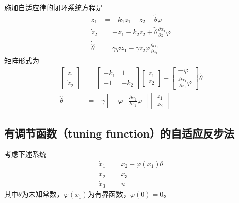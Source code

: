 \begin{note}
    施加自适应律的闭环系统方程是
\begin{align*}
  \dot{z}_1 & = - k_1 z_1 + z_2 - \tilde{\theta} \varphi\\
  \dot{z}_2 & = - z_1 - k_2 z_2 + \tilde{\theta} \frac{\partial
  \alpha_1}{\partial z_1} \varphi\\
  \dot{\hat{\theta}} & = \gamma \varphi z_1 - \gamma z_2 \varphi
  \frac{\partial \alpha_1}{\partial z_1}
\end{align*}
矩阵形式为
\begin{align*}
  \left[\begin{array}{c}
    \dot{z}_1\\
    \dot{z}_2
  \end{array}\right] & = \left[\begin{array}{cc}
    - k_1 & 1\\
    - 1 & - k_2
  \end{array}\right] \left[\begin{array}{c}
    z_1\\
    z_2
  \end{array}\right] + \left[\begin{array}{c}
    - \varphi\\
    \frac{\partial \alpha_1}{\partial z_1} \varphi
  \end{array}\right] \tilde{\theta}\\
  \dot{\hat{\theta}} & = - \gamma \left[\begin{array}{cc}
    - \varphi & \frac{\partial \alpha_1}{\partial z_1} \varphi
  \end{array}\right] \left[\begin{array}{c}
    z_1\\
    z_2
  \end{array}\right]
\end{align*}
\end{note}
\subsection{有调节函数（tuning function）的自适应反步法}
考虑下述系统
\begin{equation}
    \begin{aligned}
        \dot{x}_1&=x_2+\varphi(x_1)\theta\\
        \dot{x}_2&=x_3\\
        \dot{x}_3&=u
    \end{aligned}\label{Sys:tuning}
\end{equation}
其中$\theta$为未知常数，$\varphi(x_1)$为有界函数，$\varphi(0)=0$。


